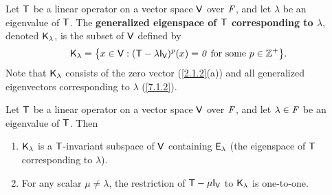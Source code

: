 \begin{defn}\label{7.1.4}
  Let \(\mathsf{T}\) be a linear operator on a vector space \(\mathsf{V}\) over \(\mathit{F}\), and let \(\lambda\) be an eigenvalue of \(\mathsf{T}\).
  The \textbf{generalized eigenspace of \(\mathsf{T}\) corresponding to \(\lambda\)}, denoted \(\mathsf{K}_{\lambda}\), is the subset of \(\mathsf{V}\) defined by
  \[
    \vs{K}_{\lambda} = \set{x \in \V : (\T - \lambda \IT[\V])^p(x) = \zv \text{ for some } p \in \Z^+}.
  \]
  Note that \(\mathsf{K}_{\lambda}\) consists of the zero vector (\cref{2.1.2}(a)) and all generalized eigenvectors corresponding to \(\lambda\) (\cref{7.1.2}).
\end{defn}

\begin{thm}\label{7.1}
  Let \(\mathsf{T}\) be a linear operator on a vector space \(\mathsf{V}\) over \(\mathit{F}\), and let \(\lambda \in \mathit{F}\) be an eigenvalue of \(\mathsf{T}\).
  Then
  \begin{enumerate}
    \item \(\mathsf{K}_{\lambda}\) is a \(\mathsf{T}\)-invariant subspace of \(\mathsf{V}\) containing \(\mathsf{E}_{\lambda}\)
          (the eigenspace of \(\mathsf{T}\) corresponding to \(\lambda\)).
    \item For any scalar \(\mu \neq \lambda\), the restriction of \(\T - \mu \IT[\V]\) to \(\mathsf{K}_{\lambda}\) is one-to-one.
  \end{enumerate}
\end{thm}

